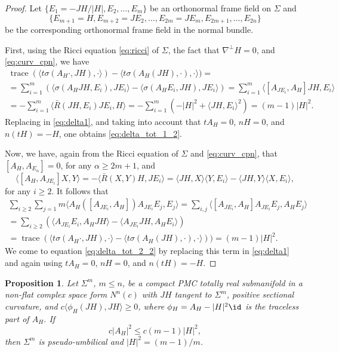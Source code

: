\documentclass[11pt]{amsart}
\theoremstyle{plain}
\newtheorem{proposition}  [theorem]  {Proposition}
\theoremstyle{definition}
\DeclareMathOperator{\trace}{trace} \DeclareMathOperator{\di}{div}
\numberwithin{equation}{section}
\begin{document}
\begin{proof} Let $\{E_1=-JH/|H|,E_2,\ldots,E_m\}$ be an orthonormal frame field on $\Sigma$ and 
$$
\{E_{m+1}=H,E_{m+2}=JE_2,\ldots,E_{2m}=JE_m,E_{2m+1},\ldots,E_{2n}\}
$$ 
be the corresponding orthonormal frame field in the normal bundle.

First, using the Ricci equation \eqref{eq:ricci} of $\Sigma$, the fact that $\nabla^{\perp}H=0$, and \eqref{eq:curv_cpn}, we have
\begin{eqnarray}\label{eq:sigma}
\trace(\langle t\sigma(A_H\cdot,JH),\cdot\rangle)-\langle t\sigma(A_H(JH),\cdot),\cdot\rangle)=\\\nonumber=\sum_{i=1}^m(\langle\sigma(A_HJH,E_i),JE_i\rangle-\langle\sigma(A_HE_i,JH),JE_i\rangle)=\sum_{i=1}^m\langle[A_{JE_i},A_H]JH,E_i\rangle&\\\nonumber=-\sum_{i=1}^m\langle\bar R(JH,E_i)JE_i,H\rangle=-\sum_{i=1}^m(-|H|^2+\langle JH,E_i\rangle^2)=(m-1)|H|^2.
\end{eqnarray}
Replacing in \eqref{eq:delta1}, and taking into account that $tA_H=0$, $nH=0$, and $n(tH)=-H$, one obtains \eqref{eq:delta_tot_1_2}.

Now, we have, again from the Ricci equation of $\Sigma$ and \eqref{eq:curv_cpn}, that $[A_H,A_{E_{\alpha}}]=0$, for any $\alpha\geq 2m+1$, and
\begin{equation*}
\langle[A_H,A_{JE_i}]X,Y\rangle=-\langle\bar R(X,Y)H,JE_i\rangle=\langle JH,X\rangle\langle Y,E_i\rangle-\langle JH,Y\rangle\langle X,E_i\rangle,
\end{equation*}
for any $i\geq 2$. It follows that
\begin{eqnarray*}
\sum_{i\geq 2}\sum_{j=1}{m}\langle A_H([A_{JE_i},A_H])A_{JE_i}E_j,E_j\rangle=\sum_{i,j}\langle[A_{JE_i},A_H]A_{JE_i}E_j,A_HE_j\rangle\\=\sum_{i\geq 2}(\langle A_{JE_i}E_i, A_HJH\rangle-\langle A_{JE_i}JH,A_HE_i\rangle)\\=\trace(\langle t\sigma(A_H\cdot,JH),\cdot\rangle-\langle t\sigma(A_H(JH),\cdot),\cdot\rangle))=(m-1)|H|^2.
\end{eqnarray*}
We come to equation \eqref{eq:delta_tot_2_2} by replacing this term in \eqref{eq:delta1} and again using $tA_H=0$, $nH=0$, and $n(tH)=-H$.
\end{proof}

\begin{proposition} Let $\Sigma^m$, $m\leq n$, be a compact PMC totally real submanifold in a non-flat complex space form $N^n(c)$ with $JH$ tangent to $\Sigma^m$, positive sectional curvature, and $c\langle\phi_H(JH),JH\rangle\geq 0$, where $\phi_H=A_H-|H|^2\id$ is the traceless part of $A_H$. If 
$$
c|A_H|^2\leq c(m-1)|H|^2,
$$
then $\Sigma^m$ is pseudo-umbilical and $|H|^2=(m-1)/m$.
\end{proposition}
\end{document}
